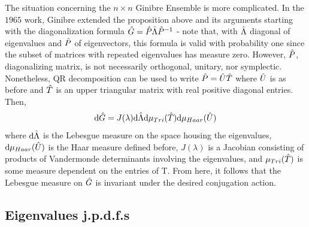 The situation concerning the $n \times n$ Ginibre Ensemble is more complicated. In the $1965$ work, Ginibre extended the proposition above and its arguments starting with the diagonalization formula $\hat G = \hat P\hat\Lambda\hat P^{-1}$ - note that, with $\hat\Lambda$ diagonal of eigenvalues and $\hat P$ of eigenvectors, this formula is valid with probability one since the subset of matrices with repeated eigenvalues has measure zero. However, $\hat P$, diagonalizing matrix, is not necessarily orthogonal, unitary, nor symplectic. Nonetheless, QR decomposition can be used to write $\hat P = \hat U\hat T$ where $\hat U$ is as before and $\hat T$ is an upper triangular matrix with real positive diagonal entries. Then,
\begin{equation}
	\mathrm{d} \hat G = J(\lambda) \mathrm{d} \hat\Lambda \mathrm{d} \mu_{Tri}(\hat T) \mathrm{d} \mu_{Haar}(\hat U)
\end{equation}
where $\mathrm{d} \hat\Lambda$ is the Lebesgue measure on the space housing the eigenvalues, $\mathrm{d} \mu_{Haar}(\hat U)$ is the Haar measure defined before, $J(\lambda)$ is a Jacobian consisting of products of Vandermonde determinants involving the eigenvalues, and $\mu_{Tri}(\hat T)$ is some measure dependent on the entries of T. From here, it follows that the Lebesgue measure on $\hat G$ is invariant under the desired conjugation action.

\subsection{Eigenvalues j.p.d.f.s}

